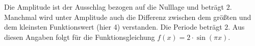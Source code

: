 \item Die Amplitude ist der Ausschlag bezogen auf die Nulllage und beträgt $2$. Manchmal wird unter Amplitude auch die Differenz zwischen dem größten und dem kleinsten Funktionswert (hier 4) verstanden. Die Periode beträgt $2$. Aus diesen Angaben folgt für die Funktionsgleichung $f(x) = 2\cdot\sin(\pi x)$. 

